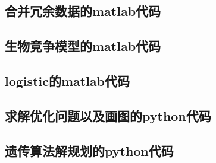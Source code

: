\documentclass[12pt, a4paper, oneside]{ctexart}
\begin{document}
\subsection{合并冗余数据的matlab代码}
\label{code:merge}

\subsection{生物竞争模型的matlab代码}
\label{code:生物竞争}

\subsection{logistic的matlab代码}
\label{code:logistic}


\subsection{求解优化问题以及画图的python代码}
\label{code:P_location}

\subsection{遗传算法解规划的python代码}
\label{code:p-中值}

\end{document}
